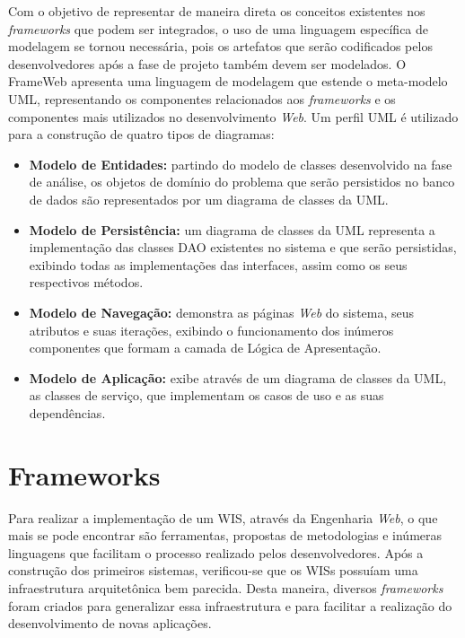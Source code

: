 Com o objetivo de representar de maneira direta os conceitos existentes nos \textit{frameworks} que podem ser integrados, o uso de uma linguagem específica de modelagem se tornou necessária, pois os artefatos que serão codificados pelos desenvolvedores após a fase de projeto também devem ser modelados. O FrameWeb apresenta uma linguagem de modelagem que estende o meta-modelo UML, representando os componentes relacionados aos \textit{frameworks} e os componentes mais utilizados no desenvolvimento \textit{Web}. Um perfil UML é utilizado para a construção de quatro tipos de diagramas: 

\begin{itemize}  

	\item \textbf{Modelo de Entidades:} partindo do modelo de classes desenvolvido na fase de análise, os objetos de domínio do problema que serão persistidos no banco de dados são representados por um diagrama de classes da UML.
	
	\item \textbf{Modelo de Persistência:} um diagrama de classes da UML representa a implementação das classes DAO existentes no sistema e que serão persistidas, exibindo todas as implementações das interfaces, assim como os seus respectivos métodos.   
	
	\item \textbf{Modelo de Navegação:} demonstra as páginas \textit{Web} do sistema, seus atributos e suas iterações, exibindo o funcionamento dos inúmeros componentes que formam a camada de Lógica de Apresentação.
	
	\item \textbf{Modelo de Aplicação:} exibe através de um diagrama de classes da UML, as classes de serviço, que implementam os casos de uso e as suas dependências.

\end{itemize}



\section{Frameworks}
\label{sec-ref-frameworks}

Para realizar a implementação de um WIS, através da Engenharia \textit{Web}, o que mais se pode encontrar são ferramentas, propostas de metodologias e inúmeras linguagens que facilitam o processo realizado pelos desenvolvedores. Após a construção dos primeiros sistemas, verificou-se que os WISs possuíam uma infraestrutura arquitetônica bem parecida. Desta maneira, diversos \textit{frameworks} foram criados para generalizar essa infraestrutura e para facilitar a realização do desenvolvimento de novas aplicações.

